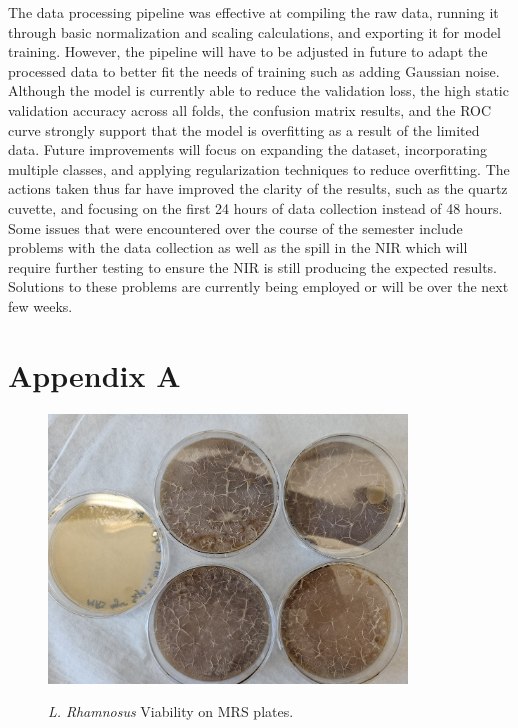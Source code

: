 \documentclass[final, 3p, 11pt]{elsarticle}
\begin{document}
The data processing pipeline was effective at compiling the raw data,  running it through basic normalization and scaling calculations, and exporting it for model training. However, the pipeline will have to be adjusted in future to adapt the processed data to better fit the needs of training such as adding Gaussian noise. Although the model is currently able to reduce the validation loss, the high static validation accuracy across all folds, the confusion matrix results, and the ROC curve strongly support that the model is overfitting as a result of the limited data. Future improvements will focus on expanding the dataset, incorporating multiple classes, and applying regularization techniques to reduce overfitting. The actions taken thus far have improved the clarity of the results, such as the quartz cuvette, and focusing on the first 24 hours of data collection instead of 48 hours. Some issues that were encountered over the course of the semester include problems with the data collection as well as the spill in the NIR which will require further testing to ensure the NIR is still producing the expected results. Solutions to these problems are currently being employed or will be over the next few weeks. 

\newpage

\newpage

\section*{Appendix A}

\renewcommand{\thefigure}{A.\arabic{figure}}
\setcounter{figure}{0}  %

\begin{figure}[H]
    \captionsetup{justification=raggedright, singlelinecheck=false, position=above}  %
    \caption{\textit{L. Rhamnosus} Viability on MRS plates.}
    \centering
    \includegraphics[width=0.85\textwidth]{Images/bacteria.png}
    \label{fig:bacteria_viability}
\end{figure}
\end{document}
